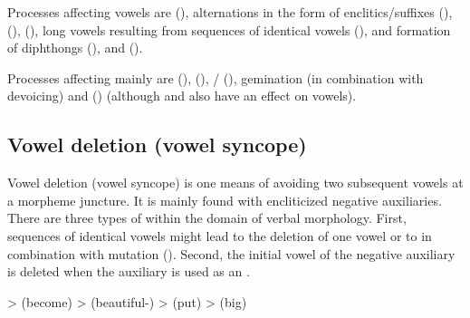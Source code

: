 Processes affecting vowels are  (), alternations in the form of enclitics\slash suffixes (),  (),  (), long vowels resulting from sequences of identical vowels (),  and formation of diphthongs (), and  ().

Processes affecting mainly  are  (),  (), \slash {} (), gemination (in combination with devoicing) and  () (although  and  also have an effect on vowels).



\subsection{Vowel deletion (vowel syncope)}
\label{ssec:Vowel deletion (vowel syncope)}

Vowel deletion (vowel syncope) is one means of avoiding two subsequent vowels at a morpheme juncture. It is mainly found with encliticized negative auxiliaries. There are three types of  within the domain of verbal morphology. First, sequences of identical vowels might lead to the deletion of one vowel or to  in combination with mutation (). Second, the initial vowel of the negative auxiliary is deleted when the auxiliary is used as an  .
%
\begin{exe}
	\ex	\label{ex:vowel syncope verbs phon}
	\begin{xlist}
		\ex	{} >  (become)			
		\ex	{} >  (beautiful-)		
		\ex	{} > \newline\hspace*{1em}(put) 
		\ex	{} >  (big)
	\end{xlist}
\end{exe}

